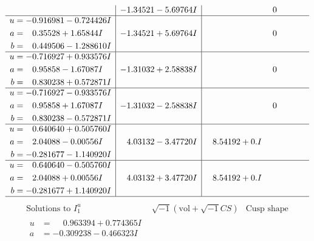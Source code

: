 \documentclass[1p]{elsarticle_modified}
\theoremstyle{definition}
\newcommand{\I}{\sqrt{-1}}
\begin{document}
$$\begin{array}{c|c|c}
 & -1.34521 - 5.69764 I & \phantom{-0.000000 } 0 \\ \hline\begin{aligned}
u &= -0.916981 - 0.724426 I \\
a &= \phantom{-}0.35528 + 1.65844 I \\
b &= \phantom{-}0.449506 - 1.288610 I\end{aligned}
 & -1.34521 + 5.69764 I & \phantom{-0.000000 } 0 \\ \hline\begin{aligned}
u &= -0.716927 + 0.933576 I \\
a &= \phantom{-}0.95858 - 1.67087 I \\
b &= \phantom{-}0.830238 + 0.572871 I\end{aligned}
 & -1.31032 + 2.58838 I & \phantom{-0.000000 } 0 \\ \hline\begin{aligned}
u &= -0.716927 - 0.933576 I \\
a &= \phantom{-}0.95858 + 1.67087 I \\
b &= \phantom{-}0.830238 - 0.572871 I\end{aligned}
 & -1.31032 - 2.58838 I & \phantom{-0.000000 } 0 \\ \hline\begin{aligned}
u &= \phantom{-}0.640640 + 0.505760 I \\
a &= \phantom{-}2.04088 - 0.00556 I \\
b &= -0.281677 - 1.140920 I\end{aligned}
 & \phantom{-}4.03132 - 3.47720 I & \phantom{-}8.54192 + 0. I\phantom{ +0.000000I} \\ \hline\begin{aligned}
u &= \phantom{-}0.640640 - 0.505760 I \\
a &= \phantom{-}2.04088 + 0.00556 I \\
b &= -0.281677 + 1.140920 I\end{aligned}
 & \phantom{-}4.03132 + 3.47720 I & \phantom{-}8.54192 + 0. I\phantom{ +0.000000I}\\
 \hline 
 \end{array}$$\newpage$$\begin{array}{c|c|c}  
\text{Solutions to }I^u_{1}& \I (\text{vol} + \sqrt{-1}CS) & \text{Cusp shape}\\
 \hline 
\begin{aligned}
u &= \phantom{-}0.963394 + 0.774365 I \\
a &= -0.309238 - 0.466323 I \\

\end{aligned}
\end{array}$$
\end{document}
